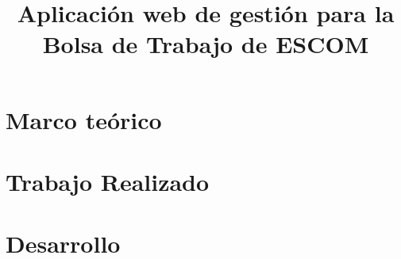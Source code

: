\documentclass[11pt, twopages]{book}
\date{}
\title{Aplicación web de gestión para la Bolsa de Trabajo de ESCOM}
\author{}
\begin{document}
    \frontmatter
        \maketitle
        \advertisment
        \responsiveletter
        \tableofcontents
        \listoffigures
        \listoftables
    \mainmatter
    

    \label{aloneparts:intro}

    \chapter{Marco teórico}
    \label{aloneparts:marcoteorico}
       

    
    \chapter{Trabajo Realizado}
    \label{sprints}
    
    \chapter{Desarrollo}
        
    \appendix


    \medskip

    \printbibliography
        \printbibliography
\end{document}

